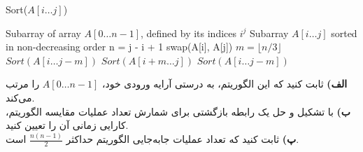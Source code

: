 \documentclass[]{article}
\begin{document}
\begin{latin}
    \begin{algorithm}[H]
        \caption*{Sort($A[i \ldots j]$)}
        \begin{algorithmic}
            \Require Subarray of array $A[0 \ldots n-1]$, defined by its indices $i ^ j$
            \Ensure Subarray $A[i \ldots j]$ sorted in non-decreasing order 
            \State n = j - i + 1
                \State swap(A[i], A[j])
                \State $m = \lfloor n / 3 \rfloor$
                \State $Sort(A[i \ldots j - m])$
                \State $Sort(A[i + m \ldots j])$
                \State $Sort(A[i \ldots j - m])$
            \EndIf
        \end{algorithmic}
    \end{algorithm}
\end{latin}


\textbf{الف)}
ثابت کنید که این الگوریتم، به درستی آرایه ورودی خود،
$A[0 \ldots n-1]$
را مرتب می‌کند.\\
\textbf{ب)}
با تشکیل و حل یک رابطه بازگشتی برای شمارش تعداد عملیات مقایسه الگوریتم،
کارایی زمانی آن را تعیین کنید.\\
\textbf{پ)}
ثابت کنید که تعداد عملیات جابه‌جایی الگوریتم حداکثر
$\frac{n(n-1)}{2}$
است.
\end{document}
